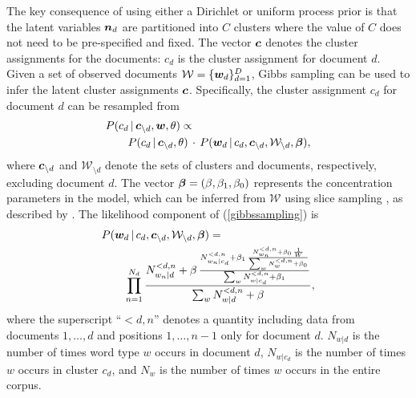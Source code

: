 \documentclass[twoside]{article}
\begin{document}
The key consequence of using either a Dirichlet or uniform process
prior is that the latent variables $\boldsymbol{n}_d$ are partitioned into $C$
clusters where the value of $C$ does not need to be pre-specified and
fixed.  The vector $\boldsymbol{c}$ denotes the cluster assignments for the
documents: $c_d$ is the cluster assignment for document $d$.  Given a
set of observed documents $\mathcal{W} = \{\boldsymbol{w}_d \}_{d=1}^D$, Gibbs
sampling \cite[]{geman84stochastic} can be used to infer the latent
cluster assignments $\boldsymbol{c}$. Specifically, the cluster assignment $c_d$
for document $d$ can be resampled from
\begin{align}
&P(c_d \,|\, \boldsymbol{c}_{\setminus d}, \boldsymbol{w}, \theta) \propto \notag\\
&\qquad P(c_d \,|\,
\boldsymbol{c}_{\setminus d}, \theta) \, \cdot \, P(\boldsymbol{w}_d \,|\, c_d,
\boldsymbol{c}_{\setminus d}, \mathcal{W}_{\setminus d},
\boldsymbol{\beta}),\label{gibbssampling}
\end{align}
where $\boldsymbol{c}_{\setminus d}$ and $\mathcal{W}_{\setminus d}$ denote the
sets of clusters and documents, respectively, excluding document $d$.
The vector $\boldsymbol{\beta} = (\beta, \beta_1, \beta_0)$ represents the
concentration parameters in the model, which can be inferred from
$\mathcal{W}$ using slice sampling \cite[]{neal03slice}, as described
by \cite{Wal08}. The likelihood component of (\ref{gibbssampling}) is
\begin{align}
& P(\boldsymbol{w}_d \,|\, c_d,
\boldsymbol{c}_{\setminus d}, \mathcal{W}_{\setminus d}, \boldsymbol{\beta}) = \notag \\
&\qquad \prod_{n=1}^{N_d} \frac{N_{w_n|d}^{<d,n} + \beta\,
  \frac{N_{w_n|c_d}^{<d,n} + \beta_1\, \frac{N_{w_n}^{<d,n} +
      \beta_0\,
      \frac{1}{W}}{\sum_w N_w^{<d,n} + \beta_0}}{\sum_w
    N_{w|c_d}^{<d,n} +
    \beta_1}}{\sum_w N_{w|d}^{<d,n} + \beta},
\end{align}
where the superscript ``$< d,n$'' denotes a quantity including data
from documents $1, \ldots, d$ and positions $1, \ldots, n-1$ only for
document $d$. $N_{w|d}$ is the number of times word type $w$ occurs in
document $d$, $N_{w|c_d}$ is the number of times $w$ occurs in cluster
$c_d$, and $N_w$ is the number of times $w$ occurs in the entire
corpus.
\end{document}
